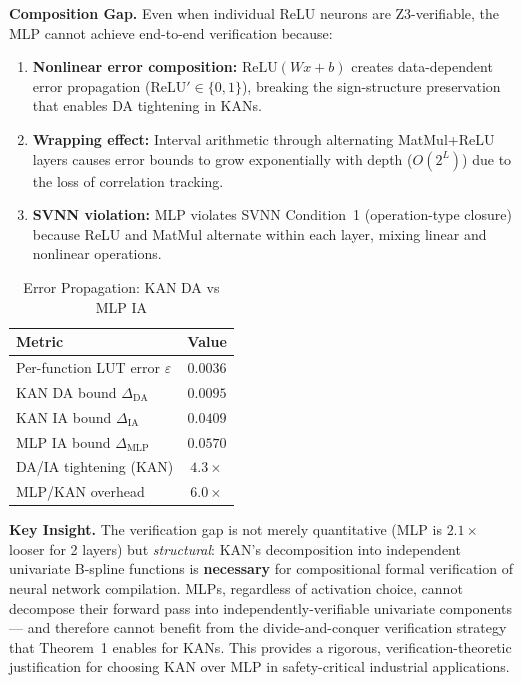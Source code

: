 \textbf{Composition Gap.}
Even when individual ReLU neurons are Z3-verifiable,
the MLP cannot achieve end-to-end verification because:
\begin{enumerate}
  \item \textbf{Nonlinear error composition:} 
  $\text{ReLU}(Wx+b)$ creates data-dependent error
  propagation ($\text{ReLU}' \in \{0,1\}$), breaking
  the sign-structure preservation that enables DA
  tightening in KANs.
  \item \textbf{Wrapping effect:} Interval arithmetic
  through alternating MatMul+ReLU layers causes
  error bounds to grow exponentially with depth
  ($O(2^L)$) due to the loss of correlation tracking.
  \item \textbf{SVNN violation:} MLP violates SVNN
  Condition~1 (operation-type closure) because ReLU
  and MatMul alternate within each layer, mixing
  linear and nonlinear operations.
\end{enumerate}

\begin{table}[ht]
\centering
\caption{Error Propagation: KAN DA vs MLP IA}
\label{tab:verify_gap_propagation}
\begin{tabular}{@{}lc@{}}
\toprule
\textbf{Metric} & \textbf{Value} \\
\midrule
  Per-function LUT error $\varepsilon$ & $0.0036$ \\
  KAN DA bound $\Delta_{\text{DA}}$ & $0.0095$ \\
  KAN IA bound $\Delta_{\text{IA}}$ & $0.0409$ \\
  MLP IA bound $\Delta_{\text{MLP}}$ & $0.0570$ \\
\midrule
  DA/IA tightening (KAN) & $4.3\times$ \\
  MLP/KAN overhead & $6.0\times$ \\
\bottomrule
\end{tabular}
\end{table}

\textbf{Key Insight.} The verification gap is not
merely quantitative (MLP is $2.1\times$ looser for
2 layers) but \textit{structural}: KAN's decomposition
into independent univariate B-spline functions is
\textbf{necessary} for compositional formal verification
of neural network compilation. MLPs, regardless of
activation choice, cannot decompose their forward pass
into independently-verifiable univariate components —
and therefore cannot benefit from the divide-and-conquer
verification strategy that Theorem~1 enables for KANs.
This provides a rigorous, verification-theoretic
justification for choosing KAN over MLP in safety-critical
industrial applications.
